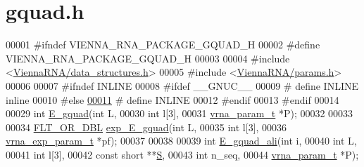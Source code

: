 \hypertarget{gquad_8h_source}{}\section{gquad.\+h}
\label{gquad_8h_source}

\begin{DoxyCode}
00001 \textcolor{preprocessor}{#ifndef VIENNA\_RNA\_PACKAGE\_GQUAD\_H}
00002 \textcolor{preprocessor}{#define VIENNA\_RNA\_PACKAGE\_GQUAD\_H}
00003 
00004 \textcolor{preprocessor}{#include <\mbox{\hyperlink{data__structures_8h}{ViennaRNA/data\_structures.h}}>}
00005 \textcolor{preprocessor}{#include <\mbox{\hyperlink{params_8h}{ViennaRNA/params.h}}>}
00006 
00007 \textcolor{preprocessor}{#ifndef INLINE}
00008 \textcolor{preprocessor}{#ifdef \_\_GNUC\_\_}
00009 \textcolor{preprocessor}{# define INLINE inline}
00010 \textcolor{preprocessor}{#else}
\mbox{\hyperlink{gquad_8h_a2eb6f9e0395b47b8d5e3eeae4fe0c116}{00011}} \textcolor{preprocessor}{# define INLINE}
00012 \textcolor{preprocessor}{#endif}
00013 \textcolor{preprocessor}{#endif}
00014 
00029 \textcolor{keywordtype}{int}         \mbox{\hyperlink{group__gquads_gaa6c187f30e29d3aa29c5b537d0f7293f}{E\_gquad}}(\textcolor{keywordtype}{int}           L,
00030                     \textcolor{keywordtype}{int}           l[3],
00031                     \mbox{\hyperlink{group__energy__parameters_structvrna__param__s}{vrna\_param\_t}}  *P);
00032 
00033 
00034 \mbox{\hyperlink{group__data__structures_ga31125aeace516926bf7f251f759b6126}{FLT\_OR\_DBL}}  \mbox{\hyperlink{group__gquads_ga4dbda5faf903ca987b296a7629764221}{exp\_E\_gquad}}(\textcolor{keywordtype}{int}               L,
00035                         \textcolor{keywordtype}{int}               l[3],
00036                         \mbox{\hyperlink{group__energy__parameters_structvrna__exp__param__s}{vrna\_exp\_param\_t}}  *pf);
00037 
00038 
00039 \textcolor{keywordtype}{int}         \mbox{\hyperlink{group__gquads_gad6cd438e9e9bd37b57b361b8ce2fd51a}{E\_gquad\_ali}}(\textcolor{keywordtype}{int}           i,
00040                         \textcolor{keywordtype}{int}           L,
00041                         \textcolor{keywordtype}{int}           l[3],
00042                         \textcolor{keyword}{const} \textcolor{keywordtype}{short}   **\mbox{\hyperlink{group__energy__parameters__rw_gga7bf2bb363bcf5ce50d60255d256e5682af1ce01387d2348f8b858721a7db81670}{S}},
00043                         \textcolor{keywordtype}{int}           n\_seq,
00044                         \mbox{\hyperlink{group__energy__parameters_structvrna__param__s}{vrna\_param\_t}}  *P);

\end{DoxyCode}
